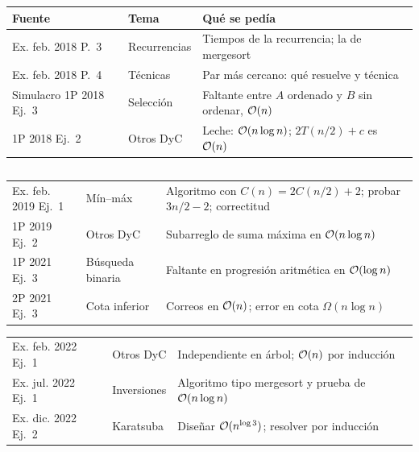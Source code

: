 {\medskip
\begin{tabularx}{\textwidth}{@{}>{\raggedright\arraybackslash}p{2.95cm}>{\raggedright\arraybackslash}p{2.75cm}>{\raggedright\arraybackslash}X@{}}
\toprule
Fuente & Tema & Qué se pedía \\
\midrule
Ex. feb. 2018 P.~3 & Recurrencias & Tiempos de la recurrencia; la de mergesort \\
Ex. feb. 2018 P.~4 & Técnicas & Par más cercano: qué resuelve y técnica \\
Simulacro 1P 2018 Ej.~3 & Selección & Faltante entre $A$ ordenado y $B$ sin ordenar, $\mathcal{O}(n)$ \\
1P 2018 Ej.~2 & Otros DyC & Leche: $\mathcal{O}(n\log n)$; $2T(n/2)+c$ es $\mathcal{O}(n)$ \\
\end{tabularx}\par\vspace{-\parskip}
\begin{tabularx}{\textwidth}{@{}>{\raggedright\arraybackslash}p{2.95cm}>{\raggedright\arraybackslash}p{2.75cm}>{\raggedright\arraybackslash}X@{}}
\end{tabularx}\par\vspace{-\parskip}
\begin{tabularx}{\textwidth}{@{}>{\raggedright\arraybackslash}p{2.95cm}>{\raggedright\arraybackslash}p{2.75cm}>{\raggedright\arraybackslash}X@{}}
Ex. feb. 2019 Ej.~1 & Mín--máx & Algoritmo con $C(n)=2C(n/2)+2$; probar $3n/2-2$; correctitud \\
1P 2019 Ej.~2 & Otros DyC & Subarreglo de suma máxima en $\mathcal{O}(n\log n)$ \\
1P 2021 Ej.~3 & Búsqueda binaria & Faltante en progresión aritmética en $\mathcal{O}(\log n)$ \\
2P 2021 Ej.~3 & Cota inferior & Correos en $\mathcal{O}(n)$; error en cota $\Omega(n\log n)$ \\
\end{tabularx}\par\vspace{-\parskip}
\begin{tabularx}{\textwidth}{@{}>{\raggedright\arraybackslash}p{2.95cm}>{\raggedright\arraybackslash}p{2.75cm}>{\raggedright\arraybackslash}X@{}}
Ex. feb. 2022 Ej.~1 & Otros DyC & Independiente en árbol; $\mathcal{O}(n)$ por inducción \\
Ex. jul. 2022 Ej.~1 & Inversiones & Algoritmo tipo mergesort y prueba de $\mathcal{O}(n\log n)$ \\
Ex. dic. 2022 Ej.~2 & Karatsuba & Diseñar $\mathcal{O}(n^{\log 3})$; resolver por inducción \\

\end{tabularx}}
